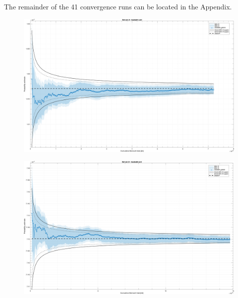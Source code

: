 The remainder of the 41 convergence runs can be located in the Appendix.

\begin{landscape}

\begin{figure}
    \centering
    \includegraphics[width=1\textwidth]{figs/convergence/e001p99/conv_fig_01.png}
    \caption{}
    \label{fig:conv_fig_01}
\end{figure}

\begin{figure}
    \centering
    \includegraphics[width=1\textwidth]{figs/convergence/e001p99/conv_fig_02.png}
    \caption{}
    \label{fig:conv_fig_02}
\end{figure}
\end{landscape}


